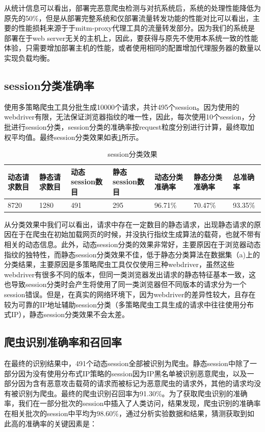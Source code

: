 \documentclass[doctor,privacy,twoside]{buaa_mac}
\begin{document}
从统计信息可以看出，部署完恶意爬虫检测与对抗系统后，系统的处理性能降低为原先的50\%，但是从部署完整系统和仅部署流量转发功能的性能对比可以看出，主要的性能损耗来源于于mitm-proxy代理工具的流量转发部分。因为我们的系统是部署在于web server无关的主机上，因此，要获得与原先不使用本系统一致的性能体验，只需要增加部署主机的性能，或者使用相同的配置增加代理服务器的数量以实现负载均衡。



\subsection{session分类准确率}
使用多策略爬虫工具分批生成10000个请求，共计495个session。因为使用的webdriver有限，无法保证浏览器指纹的唯一性，因此，每次使用10个session，分批进行session分类，session分类的准确率按request粒度分别进行计算，最终取加权平均值。最终session分类效果如表\ref{tab:session-res}所示。

\begin{table}[h]
  \caption{session分类效果}
  \label{tab:session-res}
  \centering
\begin{tabular}{|p{1.5cm}<{\centering}|p{1.5cm}<{\centering}|p{1.5cm}<{\centering}|p{1.5cm}<{\centering}|p{1.5cm}<{\centering}|p{1.5cm}<{\centering}|p{1.5cm}<{\centering}|}
    \hline
  动态请求数目 &  静态请求数目 & 动态session数目 &  静态session数目  & 动态分类准确率  & 静态分类准确率  & 总准确率 \\
    \hline
8720 & 1280 & 491 & 295 & 96.71\% & 70.47\% & 93.35\% \\

\hline
    \end{tabular}
\end{table}


从分类效果中我们可以看出，请求中存在一定数目的静态请求，出现静态请求的原因在于在爬虫在初始加载网页的时候，并没执行指纹生成算法的载荷，也就不带有相关的动态信息。此外，动态session分类的效果非常好，主要原因在于浏览器动态指纹的独特性，而静态session分类效果不佳，低于静态分类算法在数据集（a)上的分类结果，主要原因是多策略爬虫工具仅仅使用三种webdriver，虽然这些webdriver有很多不同的版本，但同一类浏览器发出请求的静态特征基本一致，这也导致session分类时会产生将使用了同一类浏览器但不同版本的请求分为一个session错误。但是，在真实的网络环境下，因为webdriver的差异性较大，且存在较为可靠的IP地址辅助session分类（多策略爬虫工具生成的请求中往往使用分布式IP），静态session分类效果不会太差。


\subsection{爬虫识别准确率和召回率}
在最终的识别结果中，491个动态session全部被识别为爬虫。静态session中除了一部分因为没有使用分布式IP策略的session因为IP黑名单被识别恶意爬虫，以及一部分因为含有恶意攻击载荷的请求而被标记为恶意爬虫的请求外，其他的请求均没有被识别为爬虫。最终的爬虫识别召回率为91.30\%。为了获取爬虫识别的准确率，我们在一部分批次的session中插入了人类访问，结果发现，爬虫识别的准确率在相关批次的session中平均为98.60\%，通过分析实验数据和结果，猜测获取到如此高的准确率的关键因素是：
\end{document}
